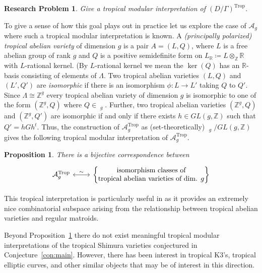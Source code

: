 \documentclass[11pt,reqno]{amsart}
\newtheorem{problem}[lemma]{Research Problem}
\newtheorem{prop}[lemma]{Proposition}
\theoremstyle{remark}
\newcommand{\GL}{{GL}}
\newcommand{\RR}{\mathbb{R}}
\newcommand{\ZZ}{\mathbb{Z}}
\DeclareMathOperator{\Trop}{Trop}
\DeclareMathOperator{\PDrt}{PD^{rt}}
\begin{document}
\begin{problem}\label{rp:trop-modular}
Give a tropical modular interpretation of $(D/\Gamma)^{\Trop}$.
\end{problem}

To give a sense of how this goal plays out in practice let us explore the case of $\mathcal{A}_{g}$ where such a tropical modular interpretation is known. A {\em (principally polarized) tropical abelian variety} of dimension $g$ is a pair $A=(L, Q)$, where $L$ is a free abelian group of rank $g$ and $Q$ is a positive semidefinite form on $L_{\RR}\coloneqq L\otimes_{\ZZ}\RR$ with $L$-rational kernel. (By $L$-rational kernel we mean the $\ker(Q)$ has an $\RR$-basis consisting of elements of $\Lambda$. Two tropical abelian varieties $(L,Q)$ and $(L',Q')$ are \emph{isomorphic} if there is an isomorphism $\phi:L \to L'$ taking $Q$ to $Q'$. Since $\Lambda \cong \ZZ^{g}$ every tropical abelian variety of dimension $g$ is isomorphic to one of the form $(\ZZ^{g},Q)$ where $Q \in \PDrt_{g}$. Further, two tropical abelian varieties $(\ZZ^{g},Q)$ and $(\ZZ^{g},Q')$ are isomorphic if and only if there exists $h\in \GL(g,\ZZ)$ such that $Q'=hGh^{t}$.  Thus, the construction of $\mathcal{A}_{g}^{\Trop}$ as (set-theoretically) $\PDrt_g/ \GL(g,\ZZ)$ gives the following tropical modular interpretation of $\mathcal{A}_{g}^{\Trop}$.

\begin{prop}\cite{BMV11}\label{prop:trop-interp-ag}
There is a bijective correspondence between
\[
\begin{tikzcd}
\mathcal{A}_{g}^{\Trop} \arrow[r, leftrightarrow, "\sim"] & \left\{ \begin{matrix} \text{isomorphism classes of} \\
\text{tropical abelian varieties of dim. $g$}
\end{matrix}\right\}
\end{tikzcd}
\]
\end{prop}

This tropical interpretation is particularly useful in \cite{BBCMMW24} as it provides an extremely nice combinatorial subspace arising from the relationship between tropical abelian varieties and regular matroids.

Beyond Proposition~\ref{prop:trop-interp-ag} there do not exist meaningful tropical modular interpretations of the tropical Shimura varieties conjectured in Conjecture~\ref{con:main}. However, there has been interest in tropical K3's, tropical elliptic curves, and other similar objects that may be of interest in this direction.
\end{document}
